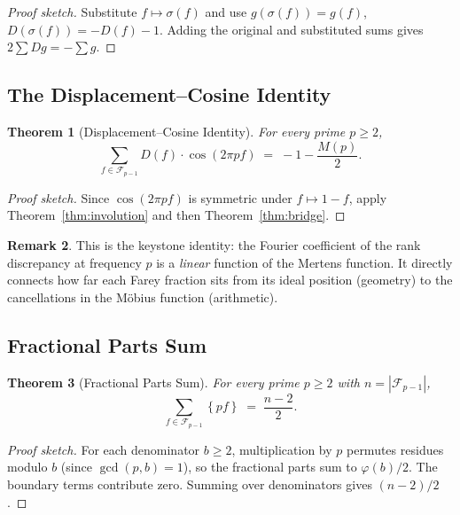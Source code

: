 \documentclass[11pt]{article}
\newtheorem{theorem}{Theorem}[section]
\theoremstyle{definition}
\newtheorem{remark}[theorem]{Remark}
\newcommand{\F}{\mathcal{F}}
\newcommand{\fpart}[1]{\left\{#1\right\}}
\begin{document}
\begin{proof}[Proof sketch]
Substitute $f \mapsto \sigma(f)$ and use $g(\sigma(f)) = g(f)$,
$D(\sigma(f)) = -D(f) - 1$.  Adding the original and substituted
sums gives $2\sum Dg = -\sum g$.
\end{proof}

\subsection{The Displacement--Cosine Identity}

\begin{theorem}[Displacement--Cosine Identity]\label{thm:disp-cos}
For every prime $p \ge 2$,
\begin{equation}\label{eq:disp-cos}
  \sum_{f \in \F_{p-1}} D(f) \cdot \cos(2\pi p f)
  \;=\; -1 - \frac{M(p)}{2}.
\end{equation}
\end{theorem}

\begin{proof}[Proof sketch]
Since $\cos(2\pi pf)$ is symmetric under $f \mapsto 1-f$,
apply Theorem~\ref{thm:involution} and then Theorem~\ref{thm:bridge}.
\end{proof}

\begin{remark}
This is the keystone identity: the Fourier coefficient of the
rank discrepancy at frequency $p$ is a \emph{linear} function
of the Mertens function.  It directly connects how far each
Farey fraction sits from its ideal position (geometry) to the
cancellations in the M\"obius function (arithmetic).
\end{remark}

\subsection{Fractional Parts Sum}

\begin{theorem}[Fractional Parts Sum]\label{thm:frac-parts}
For every prime $p \ge 2$ with $n = |\F_{p-1}|$,
\begin{equation}\label{eq:frac-parts}
  \sum_{f \in \F_{p-1}} \fpart{pf} \;=\; \frac{n-2}{2}.
\end{equation}
\end{theorem}

\begin{proof}[Proof sketch]
For each denominator $b \ge 2$, multiplication by $p$ permutes
residues modulo $b$ (since $\gcd(p,b) = 1$), so the fractional
parts sum to $\varphi(b)/2$.  The boundary terms contribute zero.
Summing over denominators gives $(n - 2)/2$.
\end{proof}
\end{document}
